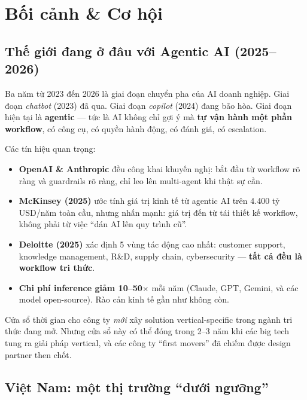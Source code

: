 \documentclass[11pt,a4paper]{article}
\begin{document}
\section{Bối cảnh \& Cơ hội}

\subsection{Thế giới đang ở đâu với Agentic AI (2025--2026)}

Ba năm từ 2023 đến 2026 là giai đoạn chuyển pha của AI doanh nghiệp. Giai đoạn
\textit{chatbot} (2023) đã qua. Giai đoạn \textit{copilot} (2024) đang bão hòa.
Giai đoạn hiện tại là \textbf{agentic} — tức là AI không chỉ gợi ý mà \textbf{tự vận
hành một phần workflow}, có công cụ, có quyền hành động, có đánh giá, có escalation.

Các tín hiệu quan trọng:
\begin{itemize}
\item \textbf{OpenAI \& Anthropic} đều công khai khuyến nghị: bắt đầu từ workflow
rõ ràng và guardrails rõ ràng, chỉ leo lên multi-agent khi thật sự cần.
\item \textbf{McKinsey (2025)} ước tính giá trị kinh tế từ agentic AI trên 4.400 tỷ
USD/năm toàn cầu, nhưng nhấn mạnh: giá trị đến từ tái thiết kế workflow, không phải
từ việc ``dán AI lên quy trình cũ''.
\item \textbf{Deloitte (2025)} xác định 5 vùng tác động cao nhất: customer support,
knowledge management, R\&D, supply chain, cybersecurity — \textbf{tất cả đều là
workflow tri thức}.
\item \textbf{Chi phí inference giảm 10--50$\times$} mỗi năm (Claude, GPT, Gemini,
và các model open-source). Rào cản kinh tế gần như không còn.
\end{itemize}

\begin{keybox}[title=Hàm ý cho chúng ta]
Cửa sổ thời gian cho công ty \textit{mới} xây solution vertical-specific
trong ngành tri thức đang mở. Nhưng cửa sổ này có thể đóng trong 2--3 năm khi
các big tech tung ra giải pháp vertical, và các công ty ``first movers'' đã
chiếm được design partner then chốt.
\end{keybox}

\subsection{Việt Nam: một thị trường ``dưới ngưỡng''}
\end{document}
